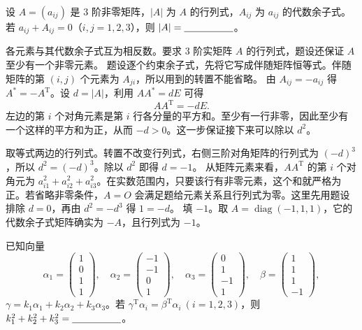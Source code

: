 \documentclass[UTF8,zihao=-4,fontset=fandol]{ctexart}
\begin{document}
设 $A=(a_{ij})$ 是 $3$ 阶非零矩阵，$|A|$ 为 $A$ 的行列式，$A_{ij}$ 为 $a_{ij}$ 的代数余子式。若 $a_{ij}+A_{ij}=0$（$i,j=1,2,3$），则 $|A|=\underline{\hspace{5em}}$。

\Solution
\Known 各元素与其代数余子式互为相反数。要求 $3$ 阶实矩阵 $A$ 的行列式，题设还保证 $A$ 至少有一个非零元素。
\Method 题设逐个约束余子式，先将它写成伴随矩阵恒等式。伴随矩阵的第 $(i,j)$ 个元素为 $A_{ji}$，所以用到的转置不能省略。
\Derive 由 $A_{ij}=-a_{ij}$ 得 $A^*=-A^{\mathrm T}$。设 $d=|A|$，利用 $AA^*=dE$ 可得
\[
AA^{\mathrm T}=-dE.
\]
左边的第 $i$ 个对角元素是第 $i$ 行各分量的平方和。至少有一行非零，因此至少有一个这样的平方和为正，从而 $-d>0$。这一步保证接下来可以除以 $d^2$。

取等式两边的行列式。转置不改变行列式，右侧三阶对角矩阵的行列式为 $(-d)^3$，所以 $d^2=(-d)^3$。除以 $d^2$ 即得 $d=-1$。
从矩阵元素来看，$AA^{\mathrm T}$ 的第 $i$ 个对角元为 $a_{i1}^2+a_{i2}^2+a_{i3}^2$。在实数范围内，只要该行有非零元素，这个和就严格为正。若省略非零条件，$A=O$ 会满足题给元素关系且行列式为零。这里先用题设排除 $d=0$，再由 $d^2=-d^3$ 得 $1=-d$。
\Verify 填 $\boxed{-1}$。取 $A=\operatorname{diag}(-1,1,1)$，它的代数余子式矩阵确实为 $-A$，且行列式为 $-1$。

已知向量
\[
\alpha_1=\begin{pmatrix}1\\0\\1\\1\end{pmatrix},\quad
\alpha_2=\begin{pmatrix}-1\\-1\\0\\1\end{pmatrix},\quad
\alpha_3=\begin{pmatrix}0\\1\\-1\\1\end{pmatrix},\quad
\beta=\begin{pmatrix}1\\1\\1\\-1\end{pmatrix},
\]
$\gamma=k_1\alpha_1+k_2\alpha_2+k_3\alpha_3$。若 $\gamma^{\mathrm T}\alpha_i=\beta^{\mathrm T}\alpha_i\ (i=1,2,3)$，则 $k_1^2+k_2^2+k_3^2=\underline{\hspace{5em}}$。
\end{document}
